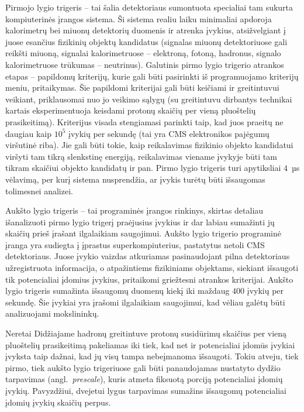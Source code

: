 \documentclass[a4paper, 12pt, oneside]{article}
\begin{document}
Pirmojo lygio trigeris -- tai šalia detektoriaus sumontuota specialiai tam sukurta kompiuterinės įrangos sistema.
Ši sistema realiu laiku minimaliai apdoroja kalorimetrų bei miuonų detektorių duomenis ir atrenka įvykius, atsižvelgiant
į juose esančius fizikinių objektų kandidatus (signalas miuonų detektoriuose gali reikšti miuoną, signalai kalorimetruose --
elektroną, fotoną, hadronus, signalo kalorimetruose trūkumas -- neutrinus).
Galutinis pirmo lygio trigerio atrankos etapas -- papildomų kriterijų, kurie gali būti pasirinkti iš programuojamo
kriterijų meniu, pritaikymas.
Šie papildomi kriterijai gali būti keičiami ir greitintuvui veikiant, priklausomai nuo jo veikimo sąlygų
(su greitintuvu dirbantys technikai kartais eksperimentuoja keisdami protonų skaičių per vieną pluoštelių prasikeitimą).
Kriterijus visada stengiamasi parinkti taip, kad juos praeitų ne daugiau kaip $10^5$ įvykių per sekundę
(tai yra CMS elektronikos pajėgumų viršutinė riba).
Jie gali būti tokie, kaip reikalavimas fizikinio objekto kandidatui viršyti tam tikrą slenkstinę energiją, reikalavimas
viename įvykyje būti tam tikram skaičiui objekto kandidatų ir pan.
Pirmo lygio trigeris turi apytiksliai $4$~µs vėlavimą, per kurį sistema nusprendžia, ar įvykis turėtų būti
išsaugomas tolimesnei analizei. 

Aukšto lygio trigeris -- tai programinės įrangos rinkinys, skirtas detaliau išanalizuoti pirmo lygio trigerį praėjusius
įvykius ir dar labiau sumažinti jų skaičių prieš įrašant ilgalaikiam saugojimui.
Aukšto lygio trigerio programinė įranga yra sudiegta į įprastus superkompiuterius, pastatytus netoli CMS detektoriaus.
Juose įvykio vaizdas atkuriamas pasinaudojant pilna detektoriaus užregistruota informacija, o atpažintiems fizikiniams
objektams, siekiant išsaugoti tik potencialiai įdomius įvykius, pritaikomi griežtesni atrankos kriterijai.
Aukšto lygio trigeris sumažinta išsaugomų duomenų kiekį iki maždaug $400$ įvykių per sekundę.
Šie įvykiai yra įrašomi ilgalaikiam saugojimui, kad vėliau galėtų būti analizuojami mokslininkų.

Neretai Didžiajame hadronų greitintuve protonų susidūrimų skaičius per vieną pluoštelių prasikeitimą pakeliamas iki tiek,
kad net ir potencialiai įdomūs įvykiai įvyksta taip dažnai, kad jų visų tampa nebeįmanoma išsaugoti.
Tokiu atveju, tiek pirmo, tiek aukšto lygio trigeriuose gali būti panaudojamas nustatyto dydžio tarpavimas (angl.\ \textit{prescale}),
kuris atmeta fiksuotą porciją potencialiai įdomių įvykių.
Pavyzdžiui, dvejetui lygus tarpavimas sumažins išsaugomų potencialiai įdomių įvykių skaičių perpus.
\end{document}
